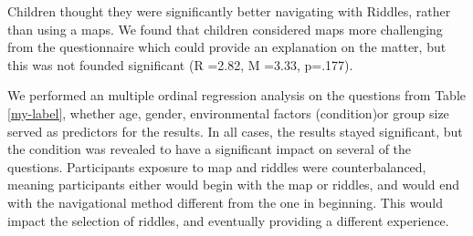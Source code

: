 Children thought they were significantly better navigating with Riddles, rather than using a maps. We found that children considered maps more challenging from the questionnaire which could provide an explanation on the matter, but this was not founded significant (R =2.82, M =3.33, p=.177).
 
We performed an multiple ordinal regression analysis on the questions from Table \ref{my-label}, whether age, gender, environmental factors (condition)or group size served as predictors for the results. In all cases, the results stayed significant, but the condition was revealed to have a significant impact on several of the questions. Participants exposure to map and riddles were counterbalanced, meaning participants either would begin with the map or riddles, and would end with the navigational method different from the one in beginning. This would impact the selection of riddles, and eventually providing a different experience. 

